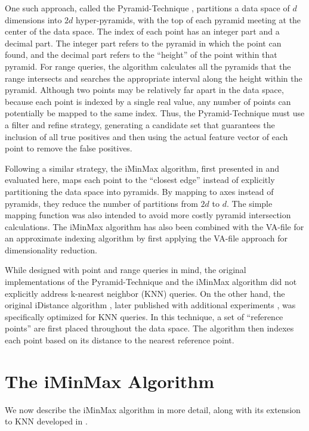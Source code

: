 \documentclass[conference]{IEEEtran}
\begin{document}
One such approach, called the Pyramid-Technique \cite{Berchtold:1998:PTB:276305.276318}, partitions a data space of $d$ dimensions into $2d$ hyper-pyramids, with the top of each pyramid meeting at the center of the data space. The index of each point has an integer part and a decimal part. The integer part refers to the pyramid in which the point can found, and the decimal part refers to the ``height'' of the point within that pyramid. For range queries, the algorithm calculates all the pyramids that the range intersects and searches the appropriate interval along the height within the pyramid. Although two points may be relatively far apart in the data space, because each point is indexed by a single real value, any number of points can potentially be mapped to the same index. Thus, the Pyramid-Technique must use a filter and refine strategy, generating a candidate set that guarantees the inclusion of all true positives and then using the actual feature vector of each point to remove the false positives.

Following a similar strategy, the iMinMax algorithm, first presented in \cite{Ooi:2000:IES:335168.335219} and evaluated here, maps each point to the ``closest edge'' instead of explicitly partitioning the data space into pyramids. By mapping to axes instead of pyramids, they reduce the number of partitions from $2d$ to $d$. The simple mapping function was also intended to avoid more costly pyramid intersection calculations. The iMinMax algorithm has also been combined with the VA-file for an approximate indexing algorithm \cite{iminmaxvafile} by first applying the VA-file approach for dimensionality reduction.

While designed with point and range queries in mind, the original implementations of the Pyramid-Technique and the iMinMax algorithm did not explicitly address k-nearest neighbor (KNN) queries. On the other hand, the original iDistance algorithm \cite{citeulike:343222}, later published with additional experiments \cite{citeulike:605413}, was specifically optimized for KNN queries. In this technique, a set of ``reference points'' are first placed throughout the data space. The algorithm then indexes each point based on its distance to the nearest reference point.

\section{The iMinMax Algorithm}
We now describe the iMinMax algorithm in more detail, along with its extension to KNN developed in \cite{iminmaxknn}.
\end{document}
